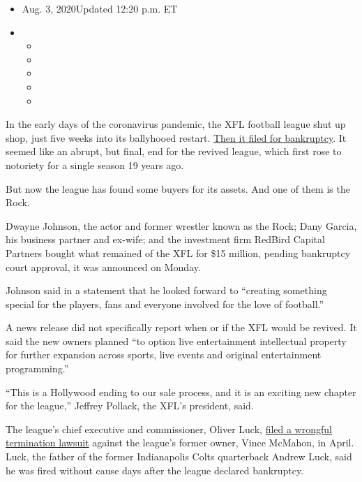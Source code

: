 \begin{itemize}
\item
  Aug. 3, 2020Updated 12:20 p.m. ET
\item
  \begin{itemize}
  \item
  \item
  \item
  \item
  \item
  \end{itemize}
\end{itemize}

In the early days of the coronavirus pandemic, the XFL football league
shut up shop, just five weeks into its ballyhooed restart.
\href{https://www.nytimes.com/2020/04/13/sports/football/xfl-bankruptcy-vince-mcmahon.html}{Then
it filed for bankruptcy}. It seemed like an abrupt, but final, end for
the revived league, which first rose to notoriety for a single season 19
years ago.

But now the league has found some buyers for its assets. And one of them
is the Rock.

Dwayne Johnson, the actor and former wrestler known as the Rock; Dany
Garcia, his business partner and ex-wife; and the investment firm
RedBird Capital Partners bought what remained of the XFL for \$15
million, pending bankruptcy court approval, it was announced on Monday.

Johnson said in a statement that he looked forward to ``creating
something special for the players, fans and everyone involved for the
love of football.''

A news release did not specifically report when or if the XFL would be
revived. It said the new owners planned ``to option live entertainment
intellectual property for further expansion across sports, live events
and original entertainment programming.''

``This is a Hollywood ending to our sale process, and it is an exciting
new chapter for the league,'' Jeffrey Pollack, the XFL's president,
said.

The league's chief executive and commissioner, Oliver Luck,
\href{https://www.nytimes.com/2020/04/21/sports/football/xfl-oliver-luck-vince-mcmahon-sued.html}{filed
a wrongful termination lawsuit} against the league's former owner, Vince
McMahon, in April. Luck, the father of the former Indianapolis Colts
quarterback Andrew Luck, said he was fired without cause days after the
league declared bankruptcy.

